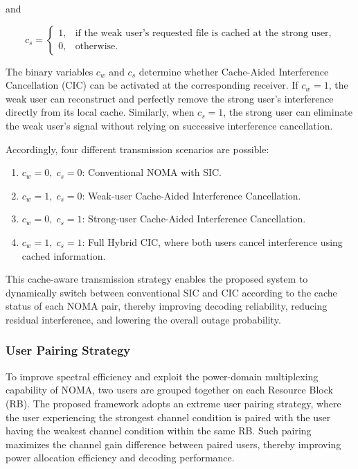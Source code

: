 \documentclass[12pt,a4paper]{article}
\begin{document}
and

\begin{equation}
c_s=
\begin{cases}
1,& \text{if the weak user's requested file is cached at the strong user},\\
0,& \text{otherwise}.
\end{cases}
\end{equation}

The binary variables $c_w$ and $c_s$ determine whether Cache-Aided Interference Cancellation (CIC) can be activated at the corresponding receiver. If $c_w=1$, the weak user can reconstruct and perfectly remove the strong user's interference directly from its local cache. Similarly, when $c_s=1$, the strong user can eliminate the weak user's signal without relying on successive interference cancellation.

Accordingly, four different transmission scenarios are possible:

\begin{enumerate}
\item $c_w=0,\;c_s=0$: Conventional NOMA with SIC.
\item $c_w=1,\;c_s=0$: Weak-user Cache-Aided Interference Cancellation.
\item $c_w=0,\;c_s=1$: Strong-user Cache-Aided Interference Cancellation.
\item $c_w=1,\;c_s=1$: Full Hybrid CIC, where both users cancel interference using cached information.
\end{enumerate}

This cache-aware transmission strategy enables the proposed system to dynamically switch between conventional SIC and CIC according to the cache status of each NOMA pair, thereby improving decoding reliability, reducing residual interference, and lowering the overall outage probability.

\subsubsection{User Pairing Strategy}

To improve spectral efficiency and exploit the power-domain multiplexing capability of NOMA, two users are grouped together on each Resource Block (RB). The proposed framework adopts an extreme user pairing strategy, where the user experiencing the strongest channel condition is paired with the user having the weakest channel condition within the same RB. Such pairing maximizes the channel gain difference between paired users, thereby improving power allocation efficiency and decoding performance.
\end{document}
